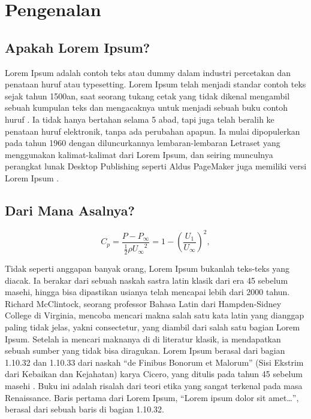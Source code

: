 \chapter{Pengenalan}
\label{bab:pengenalan}

\section{Apakah Lorem Ipsum?}
\label{sec:apadia}

Lorem Ipsum adalah contoh teks atau dummy dalam industri percetakan dan penataan huruf atau typesetting. Lorem Ipsum telah menjadi standar contoh teks sejak tahun 1500an, saat seorang tukang cetak yang tidak dikenal mengambil sebuah kumpulan teks dan mengacaknya untuk menjadi sebuah buku contoh huruf \cite{banerjee:pedersen:2003}. Ia tidak hanya bertahan selama 5 abad, tapi juga telah beralih ke penataan huruf elektronik, tanpa ada perubahan apapun. Ia mulai dipopulerkan pada tahun 1960 dengan diluncurkannya lembaran-lembaran Letraset yang menggunakan kalimat-kalimat dari Lorem Ipsum, dan seiring munculnya perangkat lunak Desktop Publishing seperti Aldus PageMaker juga memiliki versi Lorem Ipsum \cite{berment:phd:2004}.



\section{Dari Mana Asalnya?}
\label{sec:asal}

\begin{equation}
C_p = \frac{P - P_\infty}{\frac{1}{2} \rho {U_\infty}^2}
 = 1 - \left( \frac{U_1}{U_\infty} \right)^2,
\end{equation}

Tidak seperti anggapan banyak orang, Lorem Ipsum bukanlah teks-teks yang diacak. Ia berakar dari sebuah naskah sastra latin klasik dari era 45 sebelum masehi, hingga bisa dipastikan usianya telah mencapai lebih dari 2000 tahun. Richard McClintock, seorang professor Bahasa Latin dari Hampden-Sidney College di Virginia, mencoba mencari makna salah satu kata latin yang dianggap paling tidak jelas, yakni consectetur, yang diambil dari salah satu bagian Lorem Ipsum. Setelah ia mencari maknanya di di literatur klasik, ia mendapatkan sebuah sumber yang tidak bisa diragukan. Lorem Ipsum berasal dari bagian 1.10.32 dan 1.10.33 dari naskah ``de Finibus Bonorum et Malorum'' (Sisi Ekstrim dari Kebaikan dan Kejahatan) karya Cicero, yang ditulis pada tahun 45 sebelum masehi \cite{azarova:etal:2002,budanitsky:hirst:2006}. Buku ini adalah risalah dari teori etika yang sangat terkenal pada masa Renaissance. Baris pertama dari Lorem Ipsum, ``Lorem ipsum dolor sit amet\ldots'', berasal dari sebuah baris di bagian 1.10.32.

